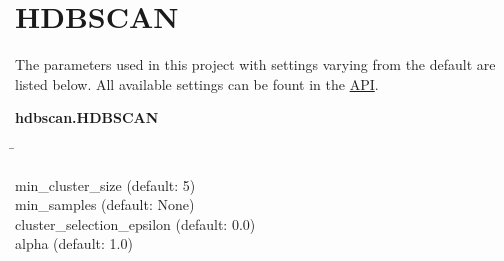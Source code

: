 \section{HDBSCAN} \label{sec:HDBSCAN}

\blindtext
\autocite{mcinnes_hdbscan_2017}
\autocite{malzer_hybrid_2020}

The parameters used in this project with settings varying from the default are listed below. All available settings can be fount in the \href{https://hdbscan.readthedocs.io/en/latest/api.html}{API}.

\begin{leftbar}
    \textbf{hdbscan.HDBSCAN}
    \begin{nstabbing}
        \qquad\qquad\qquad\qquad\qquad\quad\=\kill

        min\_cluster\_size \> (default: 5)\\
        
        min\_samples \> (default: None)\\
        
        cluster\_selection\_epsilon \> (default: 0.0)\\
        
        alpha \> (default: 1.0)
    \end{nstabbing}
\end{leftbar}

